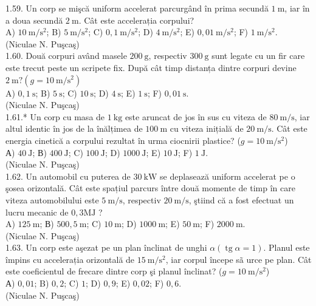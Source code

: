 \documentclass[10pt]{article}
\begin{document}
1.59. Un corp se mişcă uniform accelerat parcurgând în prima secundă $1 \mathrm{~m}$, iar în a doua secundă $2 \mathrm{~m}$. Cât este accelerația corpului?\\ A) $10 \mathrm{~m} / \mathrm{s}^{2}$; B) $5 \mathrm{~m} / \mathrm{s}^{2}$; C) $0,1 \mathrm{~m} / \mathrm{s}^{2}$; D) $4 \mathrm{~m} / \mathrm{s}^{2}$; E) $0,01 \mathrm{~m} / \mathrm{s}^{2}$; F) $1 \mathrm{~m} / \mathrm{s}^{2}$.\\ (Niculae N. Puşcaş)\\

1.60. Două corpuri având masele $200 \mathrm{~g}$, respectiv $300 \mathrm{~g}$ sunt legate cu un fir care este trecut peste un scripete fix. După cât timp distanța dintre corpuri devine $2 \mathrm{~m}? (g=10 \mathrm{~m} / \mathrm{s}^{2})$\\ A) $0,1 \mathrm{~s}$; B) $5 \mathrm{~s}$; C) $10 \mathrm{~s}$; D) $4 \mathrm{~s}$; E) $1 \mathrm{~s}$; F) $0,01 \mathrm{~s}$.\\ (Niculae N. Puşcaş)\\

1.61.* Un corp cu masa de $1 \mathrm{~kg}$ este aruncat de jos în sus cu viteza de $80 \mathrm{~m} / \mathrm{s}$, iar altul identic în jos de la înălțimea de $100 \mathrm{~m}$ cu viteza inițială de $20 \mathrm{~m} / \mathrm{s}$. Cât este energia cinetică a corpului rezultat în urma ciocnirii plastice? ($g=10 \mathrm{~m} / \mathrm{s}^{2}$)\\ А) $40 \mathrm{~J}$; В) $400 \mathrm{~J}$; C) $100 \mathrm{~J}$; D) $1000 \mathrm{~J}$; E) $10 \mathrm{~J}$; F) $1 \mathrm{~J}$.\\ (Niculae N. Puşcaş)\\

1.62. Un automobil cu puterea de $30 \mathrm{~kW}$ se deplasează uniform accelerat pe o şosea orizontală. Cât este spațiul parcurs între două momente de timp în care viteza automobilului este $5 \mathrm{~m} / \mathrm{s}$, respectiv $20 \mathrm{~m} / \mathrm{s}$, ştiind că a fost efectuat un lucru mecanic de $0,3 \mathrm{MJ}$ ?\\ A) $125 \mathrm{~m}$; В) $500,5 \mathrm{~m}$; C) $10 \mathrm{~m}$; D) $1000 \mathrm{~m}$; E) $50 \mathrm{~m}$; F) $2000 \mathrm{~m}$.\\ (Niculae N. Puşcaş)\\

1.63. Un corp este aşezat pe un plan înclinat de unghi $\alpha (\operatorname{tg} \alpha=1)$. Planul este împins cu accelerația orizontală de $15 \mathrm{~m} / \mathrm{s}^{2}$, iar corpul începe sã urce pe plan. Cât este coeficientul de frecare dintre corp şi planul înclinat? ($g=10 \mathrm{~m} / \mathrm{s}^{2}$)\\ А) $0,01$; B) $0,2$; C) $1$; D) $0,9$; E) $0,02$; F) $0,6$.\\ (Niculae N. Puşcaş)\\
\end{document}
